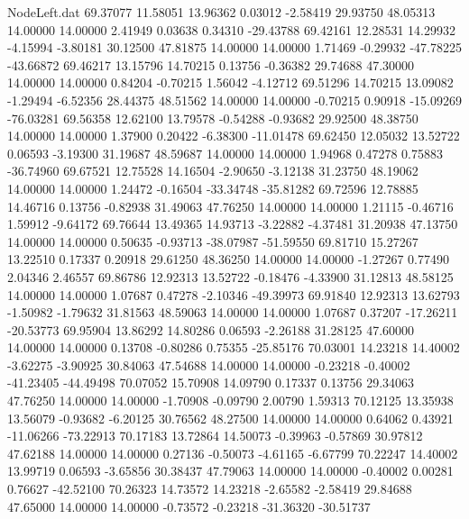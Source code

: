 \begin{filecontents}{NodeLeft.dat}
  69.37077   11.58051   13.96362     0.03012   -2.58419   29.93750   48.05313   14.00000   14.00000    2.41949    0.03638    0.34310  -29.43788
  69.42161   12.28531   14.29932    -4.15994   -3.80181   30.12500   47.81875   14.00000   14.00000    1.71469   -0.29932  -47.78225  -43.66872
  69.46217   13.15796   14.70215     0.13756   -0.36382   29.74688   47.30000   14.00000   14.00000    0.84204   -0.70215    1.56042   -4.12712
  69.51296   14.70215   13.09082    -1.29494   -6.52356   28.44375   48.51562   14.00000   14.00000   -0.70215    0.90918  -15.09269  -76.03281
  69.56358   12.62100   13.79578    -0.54288   -0.93682   29.92500   48.38750   14.00000   14.00000    1.37900    0.20422   -6.38300  -11.01478
  69.62450   12.05032   13.52722     0.06593   -3.19300   31.19687   48.59687   14.00000   14.00000    1.94968    0.47278    0.75883  -36.74960
  69.67521   12.75528   14.16504    -2.90650   -3.12138   31.23750   48.19062   14.00000   14.00000    1.24472   -0.16504  -33.34748  -35.81282
  69.72596   12.78885   14.46716     0.13756   -0.82938   31.49063   47.76250   14.00000   14.00000    1.21115   -0.46716    1.59912   -9.64172
  69.76644   13.49365   14.93713    -3.22882   -4.37481   31.20938   47.13750   14.00000   14.00000    0.50635   -0.93713  -38.07987  -51.59550
  69.81710   15.27267   13.22510     0.17337    0.20918   29.61250   48.36250   14.00000   14.00000   -1.27267    0.77490    2.04346    2.46557
  69.86786   12.92313   13.52722    -0.18476   -4.33900   31.12813   48.58125   14.00000   14.00000    1.07687    0.47278   -2.10346  -49.39973
  69.91840   12.92313   13.62793    -1.50982   -1.79632   31.81563   48.59063   14.00000   14.00000    1.07687    0.37207  -17.26211  -20.53773
  69.95904   13.86292   14.80286     0.06593   -2.26188   31.28125   47.60000   14.00000   14.00000    0.13708   -0.80286    0.75355  -25.85176
  70.03001   14.23218   14.40002    -3.62275   -3.90925   30.84063   47.54688   14.00000   14.00000   -0.23218   -0.40002  -41.23405  -44.49498
  70.07052   15.70908   14.09790     0.17337    0.13756   29.34063   47.76250   14.00000   14.00000   -1.70908   -0.09790    2.00790    1.59313
  70.12125   13.35938   13.56079    -0.93682   -6.20125   30.76562   48.27500   14.00000   14.00000    0.64062    0.43921  -11.06266  -73.22913
  70.17183   13.72864   14.50073    -0.39963   -0.57869   30.97812   47.62188   14.00000   14.00000    0.27136   -0.50073   -4.61165   -6.67799
  70.22247   14.40002   13.99719     0.06593   -3.65856   30.38437   47.79063   14.00000   14.00000   -0.40002    0.00281    0.76627  -42.52100
  70.26323   14.73572   14.23218    -2.65582   -2.58419   29.84688   47.65000   14.00000   14.00000   -0.73572   -0.23218  -31.36320  -30.51737

\end{filecontents}
